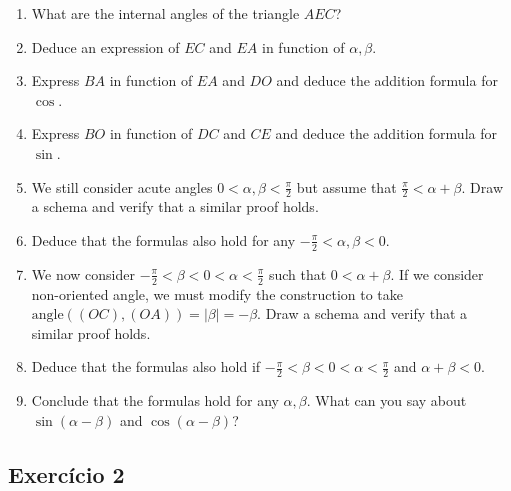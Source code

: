 \begin{enumerate}
\item What are the internal angles of the triangle $AEC$?
\item Deduce an expression of $EC$ and $EA$ in function of $\alpha, \beta$.
\item Express $BA$ in function of $EA$ and $DO$ and deduce the addition formula
  for $\cos$.
\item Express $BO$ in function of $DC$ and $CE$ and deduce the addition formula
  for $\sin$.
\item We still consider acute angles $0 < \alpha, \beta < \frac{\pi}{2}$
  but assume that $\frac{\pi}{2} < \alpha+\beta$. Draw a schema
  and verify that a similar proof holds.
\item Deduce that the formulas also hold for any
  $-\frac{\pi}{2} < \alpha, \beta < 0$.
\item We now consider $-\frac{\pi}{2} < \beta < 0 < \alpha < \frac{\pi}{2}$
  such that $0 < \alpha+\beta$.
  If we consider non-oriented angle, we must modify the construction to take
  $\text{angle}\left((OC), (OA)\right) = {|\beta|} = -\beta$.
  Draw a schema and verify that a similar proof holds.
\item Deduce that the formulas also hold
  if $-\frac{\pi}{2} < \beta < 0 < \alpha < \frac{\pi}{2}$ and
  $\alpha+\beta < 0$.
\item Conclude that the formulas hold for any $\alpha, \beta$. What can you say
  about $\sin\left(\alpha - \beta\right)$ and
  $\cos\left(\alpha - \beta\right)$?
\end{enumerate}

\subsection*{Exercício 2}

